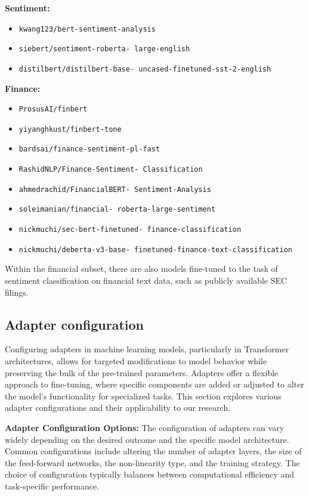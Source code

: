 \documentclass[conference]{IEEEtran}
\begin{document}
\noindent
\textbf{Sentiment:}
\begin{itemize}
\item \texttt{kwang123/bert-sentiment-analysis}
\item \texttt{siebert/sentiment-roberta- large-english}
\item \texttt{distilbert/distilbert-base- uncased-finetuned-sst-2-english}
\end{itemize}

\noindent
\textbf{Finance:}
\begin{itemize}
\item \texttt{ProsusAI/finbert}
\item \texttt{yiyanghkust/finbert-tone}
\item \texttt{bardsai/finance-sentiment-pl-fast}
\item \texttt{RashidNLP/Finance-Sentiment- Classification}
\item \texttt{ahmedrachid/FinancialBERT- Sentiment-Analysis}
\item \texttt{soleimanian/financial- roberta-large-sentiment}
\item \texttt{nickmuchi/sec-bert-finetuned- finance-classification}
\item \texttt{nickmuchi/deberta-v3-base- finetuned-finance-text-classification}
\end{itemize}

Within the financial subset, there are also models fine-tuned to the task of sentiment classification on financial text data, such as publicly available SEC filings.

\subsection{Adapter configuration}%
Configuring adapters in machine learning models, particularly in Transformer architectures, allows for targeted modifications to model behavior while preserving the bulk of the pre-trained parameters. Adapters offer a flexible approach to fine-tuning, where specific components are added or adjusted to alter the model's functionality for specialized tasks. This section explores various adapter configurations and their applicability to our research.

\textbf{Adapter Configuration Options:} The configuration of adapters can vary widely depending on the desired outcome and the specific model architecture. Common configurations include altering the number of adapter layers, the size of the feed-forward networks, the non-linearity type, and the training strategy. The choice of configuration typically balances between computational efficiency and task-specific performance.
\end{document}
